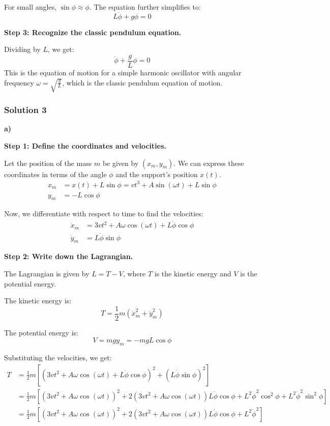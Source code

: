 \documentclass{article}
\begin{document}
For small angles, $\sin \phi \approx \phi$. The equation further simplifies to:
$$L \ddot{\phi} + g \phi = 0$$

\textbf{Step 3: Recognize the classic pendulum equation.}

Dividing by $L$, we get:
$$\ddot{\phi} + \frac{g}{L} \phi = 0$$
This is the equation of motion for a simple harmonic oscillator with angular frequency $\omega = \sqrt{\frac{g}{L}}$, which is the classic pendulum equation of motion.


\subsubsection{Solution 3}
\textbf{a)}

\textbf{Step 1: Define the coordinates and velocities.}

Let the position of the mass $m$ be given by $(x_m, y_m)$.
We can express these coordinates in terms of the angle $\phi$ and the support's position $x(t)$.
\begin{align*}
x_m &= x(t) + L \sin \phi = vt^3 + A \sin(\omega t) + L \sin \phi \\
y_m &= -L \cos \phi
\end{align*}

Now, we differentiate with respect to time to find the velocities:
\begin{align*}
\dot{x}_m &= 3vt^2 + A\omega \cos(\omega t) + L \dot{\phi} \cos \phi \\
\dot{y}_m &= L \dot{\phi} \sin \phi
\end{align*}

\textbf{Step 2: Write down the Lagrangian.}

The Lagrangian is given by $L = T - V$, where $T$ is the kinetic energy and $V$ is the potential energy.

The kinetic energy is:
$$T = \frac{1}{2} m (\dot{x}_m^2 + \dot{y}_m^2)$$

The potential energy is:
$$V = mgy_m = -mgL \cos \phi$$

Substituting the velocities, we get:
\begin{align*}
T &= \frac{1}{2} m \left[ (3vt^2 + A\omega \cos(\omega t) + L \dot{\phi} \cos \phi)^2 + (L \dot{\phi} \sin \phi)^2 \right] \\
&= \frac{1}{2} m \left[ (3vt^2 + A\omega \cos(\omega t))^2 + 2(3vt^2 + A\omega \cos(\omega t))L \dot{\phi} \cos \phi + L^2 \dot{\phi}^2 \cos^2 \phi + L^2 \dot{\phi}^2 \sin^2 \phi \right] \\
&= \frac{1}{2} m \left[ (3vt^2 + A\omega \cos(\omega t))^2 + 2(3vt^2 + A\omega \cos(\omega t))L \dot{\phi} \cos \phi + L^2 \dot{\phi}^2 \right]
\end{align*}
\end{document}
